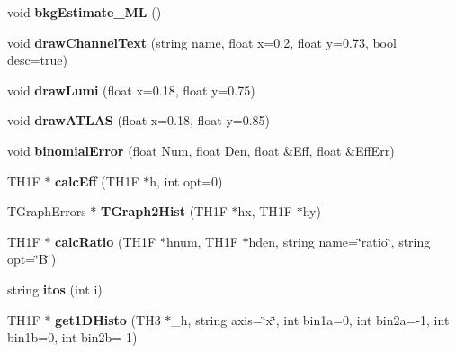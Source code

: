 \begin{DoxyCompactItemize}
\item 
\hypertarget{classDrawPlots_ababcc65a615956e941aadb7b89107cc7}{
void {\bfseries bkgEstimate\_\-ML} ()}
\label{classDrawPlots_ababcc65a615956e941aadb7b89107cc7}

\item 
\hypertarget{classDrawPlots_a8a063f2c54d4390380ea1cb26e949714}{
void {\bfseries drawChannelText} (string name, float x=0.2, float y=0.73, bool desc=true)}
\label{classDrawPlots_a8a063f2c54d4390380ea1cb26e949714}

\item 
\hypertarget{classDrawPlots_a17bc6bfc0c1a8656ce2782a61907397c}{
void {\bfseries drawLumi} (float x=0.18, float y=0.75)}
\label{classDrawPlots_a17bc6bfc0c1a8656ce2782a61907397c}

\item 
\hypertarget{classDrawPlots_af8bb3d245be3ef486e9315eb0732984f}{
void {\bfseries drawATLAS} (float x=0.18, float y=0.85)}
\label{classDrawPlots_af8bb3d245be3ef486e9315eb0732984f}

\item 
\hypertarget{classDrawPlots_a22000596ff84b774e4f44c2d542bc56c}{
void {\bfseries binomialError} (float Num, float Den, float \&Eff, float \&EffErr)}
\label{classDrawPlots_a22000596ff84b774e4f44c2d542bc56c}

\item 
\hypertarget{classDrawPlots_a31d8745d2b8ac6b4406684c6ec8fdbc8}{
TH1F $\ast$ {\bfseries calcEff} (TH1F $\ast$h, int opt=0)}
\label{classDrawPlots_a31d8745d2b8ac6b4406684c6ec8fdbc8}

\item 
\hypertarget{classDrawPlots_a0620f507d8b6167102f345e8ac407e54}{
TGraphErrors $\ast$ {\bfseries TGraph2Hist} (TH1F $\ast$hx, TH1F $\ast$hy)}
\label{classDrawPlots_a0620f507d8b6167102f345e8ac407e54}

\item 
\hypertarget{classDrawPlots_a3e60963f3fe5af21c4ecbd822c3b9977}{
TH1F $\ast$ {\bfseries calcRatio} (TH1F $\ast$hnum, TH1F $\ast$hden, string name=\char`\"{}ratio\char`\"{}, string opt=\char`\"{}B\char`\"{})}
\label{classDrawPlots_a3e60963f3fe5af21c4ecbd822c3b9977}

\item 
\hypertarget{classDrawPlots_a124da2c2cd255b876c016f67d81530c3}{
string {\bfseries itos} (int i)}
\label{classDrawPlots_a124da2c2cd255b876c016f67d81530c3}

\item 
\hypertarget{classDrawPlots_a6c707eb431409c86607ea2d92bd6ece9}{
TH1F $\ast$ {\bfseries get1DHisto} (TH3 $\ast$\_\-h, string axis=\char`\"{}x\char`\"{}, int bin1a=0, int bin2a=-\/1, int bin1b=0, int bin2b=-\/1)}
\label{classDrawPlots_a6c707eb431409c86607ea2d92bd6ece9}


\end{DoxyCompactItemize}
